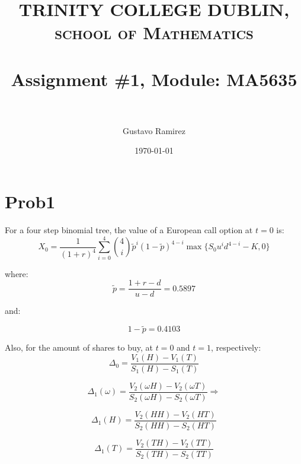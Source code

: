 \documentclass[paper=a4, fontsize=11pt]{scrartcl} %
\title{	
\normalfont \normalsize 
\textsc{TRINITY COLLEGE DUBLIN, school of Mathematics} \\ [25pt] %
\horrule{0.5pt} \\[0.4cm] %
\huge Assignment \#1, Module: MA5635 \\ %
\horrule{2pt} \\[0.5cm] %
}
\author{Gustavo Ramirez} %
\date{\normalsize\today} %
\numberwithin{equation}{section} %
\numberwithin{figure}{section} %
\numberwithin{table}{section} %
\begin{document}
\maketitle %


\begin{comment}
\section{Problem description}

\begin{enumerate}
\item 
\item 
\item 
\item 
\end{enumerate}

\end{comment}

\newpage





\section{Prob1}

For a four step binomial tree, the value of a European call option at $t = 0$ is:
$$ X_{0} = \frac{1}{(1+r)^{4}}\sum_{i=0}^{4}{4 \choose i} \widetilde{p}^{i}(1-\widetilde{p})^{4-i}\max \{ S_{0}u^{i}d^{4-i} - K, 0 \} $$

where:
$$ \widetilde{p} = \frac{1+r-d}{u-d} = 0.5897 $$

and:

$$ 1- \widetilde{p} = 0.4103 $$



Also, for the amount of shares to buy, at $t = 0$ and $t = 1$, respectively:
$$ \Delta_{0} = \frac{V_{1}(H) - V_{1}(T)}{S_{1}(H) - S_{1}(T)} $$

$$ \Delta_{1}(\omega) = \frac{V_{2}(\omega H) - V_{2}(\omega T )}{S_{2}(\omega H) - S_{2}(\omega T)} \Rightarrow $$

$$ \Delta_{1}(H) = \frac{V_{2}(H H) - V_{2}(HT )}{S_{2}(H H) - S_{2}(H T)}$$

$$ \Delta_{1}(T) = \frac{V_{2}(T H) - V_{2}(T T )}{S_{2}(T H) - S_{2}(T T)}$$
\end{document}
